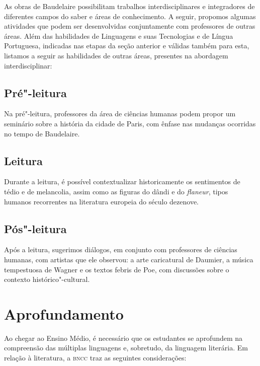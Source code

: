 \documentclass[12pt]{extarticle}
\begin{document}
As obras de Baudelaire possibilitam trabalhos interdisciplinares e
integradores de diferentes campos do saber e áreas de conhecimento. A
seguir, propomos algumas atividades que podem ser desenvolvidas
conjuntamente com professores de outras áreas. Além das habilidades de
Linguagens e suas Tecnologias e de Língua Portuguesa, indicadas nas
etapas da seção anterior e válidas também para esta, listamos a seguir
as habilidades de outras áreas, presentes na abordagem interdisciplinar:


\subsection{Pré"-leitura}

Na pré"-leitura, professores da área de ciências humanas
podem propor um seminário sobre a história da cidade de Paris, com
ênfase nas mudanças ocorridas no tempo de Baudelaire.

\subsection{Leitura}

Durante a leitura, é possível contextualizar historicamente
os sentimentos de tédio e de melancolia, assim como as figuras do dândi
e do \textit{flaneur}, tipos humanos recorrentes na literatura europeia do
século dezenove.

\subsection{Pós"-leitura}

Após a leitura, sugerimos diálogos, em conjunto com
professores de ciências humanas, com artistas que ele observou: a arte
caricatural de Daumier, a música tempestuosa de Wagner e os textos
febris de Poe, com discussões sobre o contexto histórico"-cultural.

\section{Aprofundamento}

Ao chegar ao Ensino Médio, é necessário que os estudantes se aprofundem
na compreensão das múltiplas linguagens e, sobretudo, da linguagem
literária. Em relação à literatura, a \textsc{bncc} traz as seguintes
considerações:
\end{document}
